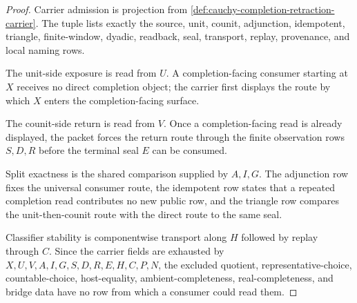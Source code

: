 \begin{proof}
Carrier admission is projection from \autoref{def:cauchy-completion-retraction-carrier}. The tuple lists exactly the source, unit, counit, adjunction, idempotent, triangle, finite-window, dyadic, readback, seal, transport, replay, provenance, and local naming rows.

The unit-side exposure is read from $U$. A completion-facing consumer starting at $X$ receives no direct completion object; the carrier first displays the route by which $X$ enters the completion-facing surface.

The counit-side return is read from $V$. Once a completion-facing read is already displayed, the packet forces the return route through the finite observation rows $S,D,R$ before the terminal seal $E$ can be consumed.

Split exactness is the shared comparison supplied by $A,I,G$. The adjunction row fixes the universal consumer route, the idempotent row states that a repeated completion read contributes no new public row, and the triangle row compares the unit-then-counit route with the direct route to the same seal.

Classifier stability is componentwise transport along $H$ followed by replay through $C$. Since the carrier fields are exhausted by $X,U,V,A,I,G,S,D,R,E,H,C,P,N$, the excluded quotient, representative-choice, countable-choice, host-equality, ambient-completeness, real-completeness, and bridge data have no row from which a consumer could read them.
\end{proof}

